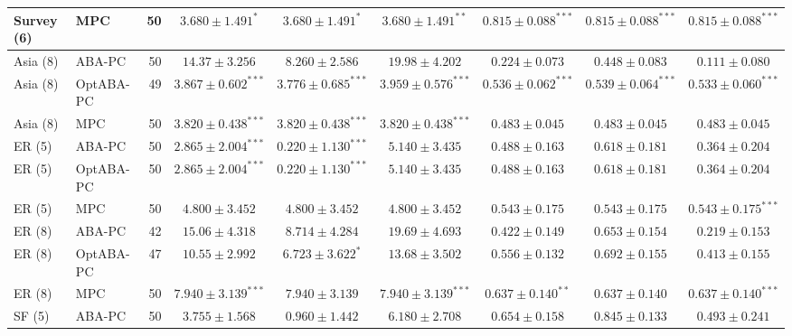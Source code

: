 \begin{table}[t]
{\begin{tabular}{llrcccccc}
Survey (6) & MPC & 50 & $\mathbf{3.680\pm1.491}^{\ast}$ & $\mathbf{3.680\pm1.491}^{\ast}$ & $\mathbf{3.680\pm1.491}^{\ast\ast}$ & $\mathbf{0.815\pm0.088}^{\ast\ast\ast}$ & $\mathbf{0.815\pm0.088}^{\ast\ast\ast}$ & $\mathbf{0.815\pm0.088}^{\ast\ast\ast}$\\
\midrule
Asia (8) & ABA-PC & 50 & $14.37\pm3.256$ & $8.260\pm2.586$ & $19.98\pm4.202$ & $0.224\pm0.073$ & $0.448\pm0.083$ & $0.111\pm0.080$\\
Asia (8) & OptABA-PC & 49 & $\mathbf{3.867\pm0.602}^{\ast\ast\ast}$ & $\mathbf{3.776\pm0.685}^{\ast\ast\ast}$ & $\mathbf{3.959\pm0.576}^{\ast\ast\ast}$ & $\mathbf{0.536\pm0.062}^{\ast\ast\ast}$ & $\mathbf{0.539\pm0.064}^{\ast\ast\ast}$ & $\mathbf{0.533\pm0.060}^{\ast\ast\ast}$\\
Asia (8) & MPC & 50 & $\mathbf{3.820\pm0.438}^{\ast\ast\ast}$ & $\mathbf{3.820\pm0.438}^{\ast\ast\ast}$ & $\mathbf{3.820\pm0.438}^{\ast\ast\ast}$ & $0.483\pm0.045$ & $0.483\pm0.045$ & $0.483\pm0.045$\\
\midrule
ER (5) & ABA-PC & 50 & $\mathbf{2.865\pm2.004}^{\ast\ast\ast}$ & $\mathbf{0.220\pm1.130}^{\ast\ast\ast}$ & $\mathbf{5.140\pm3.435}$ & $\mathbf{0.488\pm0.163}$ & $\mathbf{0.618\pm0.181}$ & $0.364\pm0.204$\\
ER (5) & OptABA-PC & 50 & $\mathbf{2.865\pm2.004}^{\ast\ast\ast}$ & $\mathbf{0.220\pm1.130}^{\ast\ast\ast}$ & $\mathbf{5.140\pm3.435}$ & $\mathbf{0.488\pm0.163}$ & $\mathbf{0.618\pm0.181}$ & $0.364\pm0.204$\\
ER (5) & MPC & 50 & $4.800\pm3.452$ & $4.800\pm3.452$ & $\mathbf{4.800\pm3.452}$ & $\mathbf{0.543\pm0.175}$ & $\mathbf{0.543\pm0.175}$ & $\mathbf{0.543\pm0.175}^{\ast\ast\ast}$\\
\midrule
ER (8) & ABA-PC & 42 & $15.06\pm4.318$ & $8.714\pm4.284$ & $19.69\pm4.693$ & $0.422\pm0.149$ & $\mathbf{0.653\pm0.154}$ & $0.219\pm0.153$\\
ER (8) & OptABA-PC & 47 & $10.55\pm2.992$ & $\mathbf{6.723\pm3.622}^{\ast}$ & $13.68\pm3.502$ & $0.556\pm0.132$ & $\mathbf{0.692\pm0.155}$ & $0.413\pm0.155$\\
ER (8) & MPC & 50 & $\mathbf{7.940\pm3.139}^{\ast\ast\ast}$ & $\mathbf{7.940\pm3.139}$ & $\mathbf{7.940\pm3.139}^{\ast\ast\ast}$ & $\mathbf{0.637\pm0.140}^{\ast\ast}$ & $\mathbf{0.637\pm0.140}$ & $\mathbf{0.637\pm0.140}^{\ast\ast\ast}$\\
\midrule
SF (5) & ABA-PC & 50 & $3.755\pm1.568$ & $\mathbf{0.960\pm1.442}$ & $6.180\pm2.708$ & $0.654\pm0.158$ & $\mathbf{0.845\pm0.133}$ & $0.493\pm0.241$\\

\end{tabular}}
\end{table}
